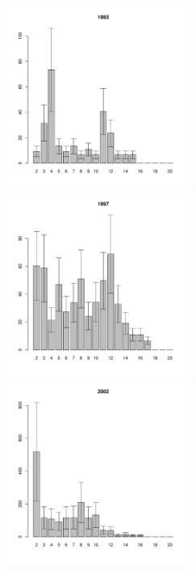\documentclass[12pt, a4paper]{article}
\begin{document}
\begin{figure}[h]
\begin{multicols}{3}
\hfill
\includegraphics[width=60mm]{../White_Sea/Luvenga_II_razrez/fucus_zone2_1993_.pdf}
\hfill
\includegraphics[width=60mm]{../White_Sea/Luvenga_II_razrez/fucus_zone2_1997_.pdf}
\hfill
\includegraphics[width=60mm]{../White_Sea/Luvenga_II_razrez/fucus_zone2_2002_.pdf}
\end{multicols}



\end{figure}
\end{document}
